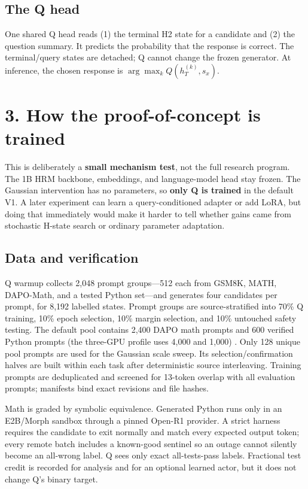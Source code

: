 \documentclass[10pt]{article}
\newcommand{\term}[1]{\textbf{\color{navy}#1}}
\begin{document}
\subsection*{The Q head}

One shared Q head reads (1) the terminal H2 state for a candidate and (2) the
question summary. It predicts the probability that the response is correct.
The terminal/query states are detached; Q cannot change the frozen generator.
At inference, the chosen response is $\arg\max_k Q(h_T^{(k)},s_x)$.

\newpage
\section*{3. How the proof-of-concept is trained}

This is deliberately a \term{small mechanism test}, not the full research
program.  The 1B HRM backbone, embeddings, and language-model head stay frozen.
The Gaussian intervention has no parameters, so \textbf{only Q is trained} in
the default V1. A later experiment can learn a query-conditioned adapter or add
LoRA, but doing that immediately would make it harder to tell whether gains came
from stochastic H-state search or ordinary parameter adaptation.

\subsection*{Data and verification}

Q warmup collects 2,048 prompt groups---512 each from GSM8K, MATH, DAPO-Math,
and a tested Python set---and generates four candidates per prompt, for 8,192
labelled states.  Prompt groups are source-stratified into 70\% Q training,
10\% epoch selection, 10\% margin selection, and 10\% untouched safety testing.
The default pool contains 2,400 DAPO math prompts and 600 verified Python
prompts (the three-GPU profile uses 4,000 and 1,000) \cite{dapo,openr1}.
Only 128 unique pool prompts are used for the Gaussian scale sweep. Its
selection/confirmation halves are built within each task after deterministic
source interleaving. Training prompts are deduplicated and screened for
13-token overlap with all evaluation prompts; manifests bind exact revisions
and file hashes.

Math is graded by symbolic equivalence.  Generated Python runs only in an
E2B/Morph sandbox through a pinned Open-R1 provider.  A strict harness requires
the candidate to exit normally and match every expected output token; every
remote batch includes a known-good sentinel so an outage cannot silently become
an all-wrong label. Q sees only exact all-tests-pass labels. Fractional test
credit is recorded for analysis and for an optional learned actor, but it does
not change Q's binary target.
\end{document}
